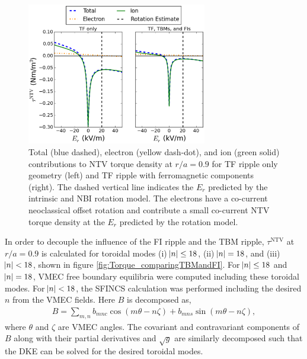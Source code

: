\documentclass[aip, pop, preprint]{revtex4-1}
\numberwithin{figure}{section}
\numberwithin{equation}{section}
\begin{document}
\begin{figure}[h!]
\centering
\includegraphics[width=0.7\textwidth]{figure7.eps}
\caption{\label{fig:Torque_eandi} Total (blue dashed), electron (yellow dash-dot), and ion (green solid) contributions to NTV torque density at $r/a = 0.9$ for TF ripple only geometry (left) and TF ripple with ferromagnetic components (right). The dashed vertical line indicates the $E_r$ predicted by the intrinsic and NBI rotation model. The electrons have a co-current neoclassical offset rotation and contribute a small co-current NTV torque density at the $E_r$ predicted by the rotation model.}
\end{figure}

In order to decouple the influence of the FI ripple and the TBM ripple, $\tau^{\mathrm{NTV}}$ at $r/a = 0.9$ is calculated for toroidal modes (i) $\abs{n} \leq 18$, (ii) $\abs{n} = 18$, and (iii) $\abs{n} < 18$, shown in figure \ref{fig:Torque_comparingTBMandFI}. For $\abs{n} \leq 18$ and $\abs{n} = 18$, VMEC free boundary equilibria were computed including these toroidal modes. For $\abs{n} < 18$, the SFINCS calculation was performed including the desired $n$ from the VMEC fields. Here $B$ is decomposed as,
\begin{gather}
B = \sum_{m,n} b_{mnc} \cos(m\theta-n\zeta) + b_{mns} \sin(m\theta-n\zeta),
\end{gather}
where $\theta$ and $\zeta$ are VMEC angles. The covariant and contravariant components of $B$ along with their partial derivatives and $\sqrt{g}$ are similarly decomposed such that the DKE can be solved for the desired toroidal modes.
\end{document}
